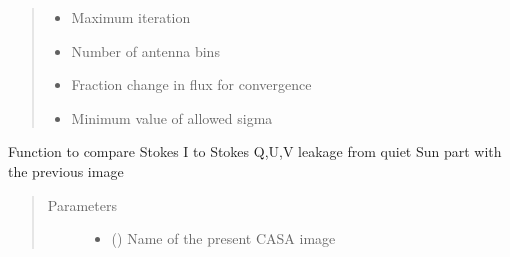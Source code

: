 \documentclass[letterpaper,10pt,english]{sphinxmanual}
\begin{document}
\begin{fulllineitems}
\begin{fulllineitems}
\begin{quote}
\begin{description}
\begin{itemize}
\item {} 
\sphinxAtStartPar
{} \textendash{} Maximum iteration

\item {} 
\sphinxAtStartPar
{} \textendash{} Number of antenna bins

\item {} 
\sphinxAtStartPar
{} \textendash{} Fraction change in flux for convergence

\item {} 
\sphinxAtStartPar
{} \textendash{} Minimum value of allowed sigma

\end{itemize}


\end{description}\end{quote}

\end{fulllineitems}


\begin{fulllineitems}
\label{\detokenize{paircars:paircars.fullpol_selfcal_LTS.PolSelfcal.compare_leakage_for_sun}}
\sphinxAtStartPar
Function to compare Stokes I to Stokes Q,U,V leakage from quiet Sun part with the previous image
\begin{quote}\begin{description}
\item[{Parameters}] \leavevmode\begin{itemize}
\item {} 
\sphinxAtStartPar
{} () \textendash{} Name of the present CASA image


\end{itemize}
\end{description}
\end{quote}
\end{fulllineitems}
\end{fulllineitems}
\end{document}
